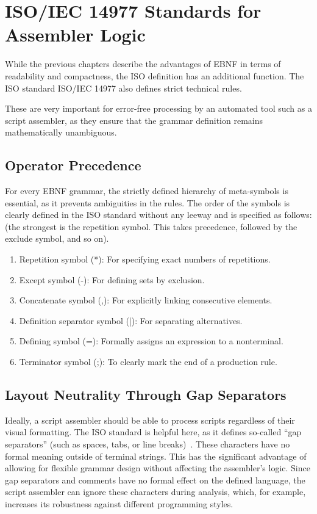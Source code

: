 \section{ISO/IEC 14977 Standards for Assembler Logic}

While the previous chapters describe the advantages of EBNF in terms of readability and compactness, the ISO definition has an additional function. The ISO standard ISO/IEC 14977 also defines strict technical rules.

These are very important for error-free processing by an automated tool such as a script assembler, as they ensure that the grammar definition remains mathematically unambiguous.

\subsection{Operator Precedence}

For every EBNF grammar, the strictly defined hierarchy of meta-symbols is essential, as it prevents ambiguities in the rules.
The order of the symbols is clearly defined in the ISO standard without any leeway and is specified as follows: (the strongest is the repetition symbol. This takes precedence, followed by the exclude symbol, and so on).
\begin{enumerate}
\item Repetition symbol (*): For specifying exact numbers of repetitions.
\item Except symbol (-): For defining sets by exclusion.
\item Concatenate symbol (,): For explicitly linking consecutive elements.
\item Definition separator symbol (|): For separating alternatives.
\item Defining symbol (=): Formally assigns an expression to a nonterminal.
\item Terminator symbol (;): To clearly mark the end of a production rule.
\end{enumerate}

\cite[p.~1]{ISO/IEC149771996InformationBNF}

\subsection{Layout Neutrality Through Gap Separators}

Ideally, a script assembler should be able to process scripts regardless of their visual formatting. The ISO standard is helpful here, as it defines so-called ``gap separators'' (such as spaces, tabs, or line breaks)~\cite[pp.~5]{ISO/IEC149771996InformationBNF}. These characters have no formal meaning outside of terminal strings. This has the significant advantage of allowing for flexible grammar design without affecting the assembler's logic. Since gap separators and comments have no formal effect on the defined language, the script assembler can ignore these characters during analysis, which, for example, increases its robustness against different programming styles.

